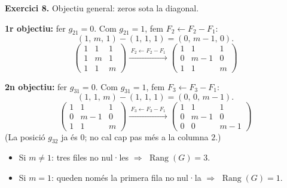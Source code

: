 \documentclass[12pt,a4paper]{article}
\newcommand{\blocInici}{%
  \par\nobreak\vspace{0pt}%
  \begin{minipage}[t]{\linewidth}%
}
\newcommand{\blocFi}{%
  \end{minipage}%
  \par
}
\newcommand{\gaussFletxa}[1]{%
  \mathrel{\xrightarrow{\;\scriptstyle #1\;}}%
}
\begin{document}
\vspace{0.55em}

%
\blocInici
\noindent\textbf{Exercici 8.}
Objectiu general: zeros sota la diagonal.

\textbf{1r objectiu:} fer $g_{21}=0$.
Com $g_{21}=1$, fem $F_2 \leftarrow F_2 - F_1$:
{\setlength{\arraycolsep}{3pt}%
\[
  (1,\,m,\,1) - (1,\,1,\,1) = (0,\,m-1,\,0).
\]
\[
  \begin{pmatrix} 1 & 1 & 1 \\ 1 & m & 1 \\ 1 & 1 & m \end{pmatrix}
  \gaussFletxa{F_2 \leftarrow F_2 - F_1}
  \begin{pmatrix} 1 & 1 & 1 \\ 0 & m-1 & 0 \\ 1 & 1 & m \end{pmatrix}
\]
}

\textbf{2n objectiu:} fer $g_{31}=0$.
Com $g_{31}=1$, fem $F_3 \leftarrow F_3 - F_1$:
{\setlength{\arraycolsep}{3pt}%
\[
  (1,\,1,\,m) - (1,\,1,\,1) = (0,\,0,\,m-1).
\]
\[
  \begin{pmatrix} 1 & 1 & 1 \\ 0 & m-1 & 0 \\ 1 & 1 & m \end{pmatrix}
  \gaussFletxa{F_3 \leftarrow F_3 - F_1}
  \begin{pmatrix} 1 & 1 & 1 \\ 0 & m-1 & 0 \\ 0 & 0 & m-1 \end{pmatrix}
\]
}
(La posició $g_{32}$ ja és $0$; no cal cap pas més a la columna $2$.)
\begin{itemize}[leftmargin=1.2em,itemsep=0.2em]
  \item Si $m \neq 1$: tres files no nul·les $\Rightarrow$ $\operatorname{Rang}(G) = 3$.
  \item Si $m = 1$: queden només la primera fila no nul·la
    $\Rightarrow$ $\operatorname{Rang}(G) = 1$.
\end{itemize}
\blocFi
\end{document}
